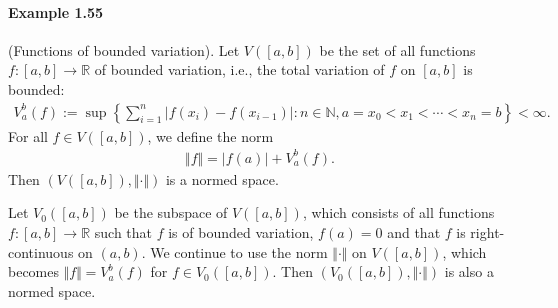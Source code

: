\documentclass{article}
\begin{document}
\paragraph{Example 1.55} (Functions of bounded variation). Let $V([a,b])$ be the set of all functions $f:[a,b]\to\mathbb{R}$ of bounded variation, i.e., the total variation of $f$ on $[a,b]$ is bounded:
\begin{align*}
	V_a^b(f) := \sup\left\{\sum_{i=1}^n\left\vert f(x_i)  - f(x_{i-1})\right\vert:n\in\mathbb{N},a=x_0<x_1<\cdots<x_n=b\right\} < \infty.
\end{align*}
For all $f\in V([a,b])$, we define the norm
\begin{align*}
	\Vert f\Vert = \vert f(a)\vert + V_a^b(f).
\end{align*}
Then $(V([a,b]),\Vert\cdot\Vert)$ is a normed space.
\vspace{0.1cm}

Let $V_0([a,b])$ be the subspace of $V([a,b])$, which consists of all functions $f:[a,b]\to\mathbb{R}$ such that $f$ is of bounded variation, $f(a)=0$ and that $f$ is right-continuous on $(a,b)$. We continue to use the norm $\Vert\cdot\Vert$ on $V([a,b])$, which becomes $\Vert f\Vert = V_a^b(f)$ for $f\in V_0([a,b])$. Then $(V_0([a,b]),\Vert\cdot\Vert)$ is also a normed space.
\end{document}
